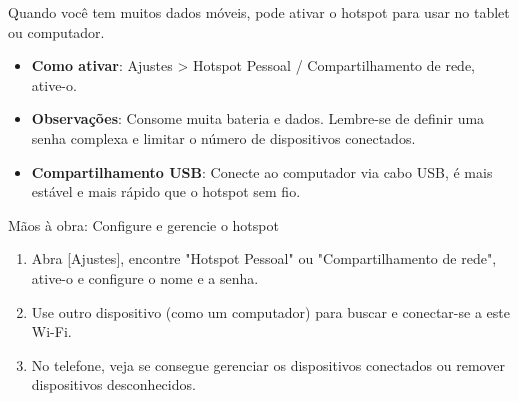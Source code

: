 
Quando você tem muitos dados móveis, pode ativar o hotspot para usar no tablet ou computador.

\begin{itemize}
  \item \textbf{Como ativar}: Ajustes > Hotspot Pessoal / Compartilhamento de rede, ative-o.
  \item \textbf{Observações}: Consome muita bateria e dados. Lembre-se de definir uma senha complexa e limitar o número de dispositivos conectados.
  \item \textbf{Compartilhamento USB}: Conecte ao computador via cabo USB, é mais estável e mais rápido que o hotspot sem fio.
\end{itemize}

\begin{tcbpractice}{Mãos à obra: Configure e gerencie o hotspot}
\begin{enumerate}
  \item Abra [Ajustes], encontre "Hotspot Pessoal" ou "Compartilhamento de rede", ative-o e configure o nome e a senha.
  \item Use outro dispositivo (como um computador) para buscar e conectar-se a este Wi-Fi.
  \item No telefone, veja se consegue gerenciar os dispositivos conectados ou remover dispositivos desconhecidos.
\end{enumerate}

\end{tcbpractice}
